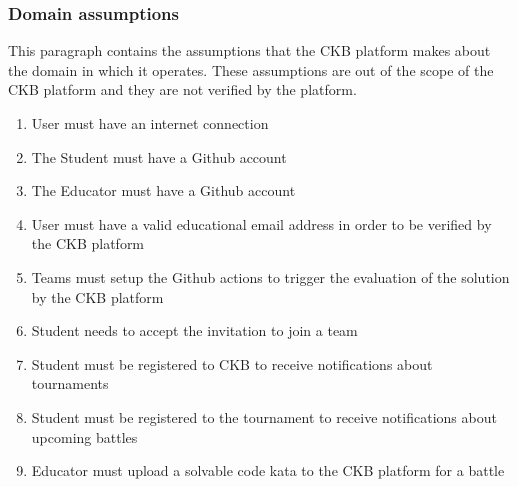 \subsubsection{Domain assumptions}
This paragraph contains the assumptions that the CKB platform makes about the domain in which it operates. These assumptions are out of the scope of the CKB platform and they are not verified by the platform.

\begin{enumerate}[label=D\arabic*:]
    \item User must have an internet connection
    \item The Student must have a Github account
    \item The Educator must have a Github account
    \item User must have a valid educational email address in order to be verified by the CKB platform
    \item Teams must setup the Github actions to trigger the evaluation of the solution by the CKB platform
    \item Student needs to accept the invitation to join a team
    \item Student must be registered to CKB to receive notifications about tournaments
    \item Student must be registered to the tournament to receive notifications about upcoming battles
    \item Educator must upload a solvable code kata to the CKB platform for a battle
\end{enumerate}